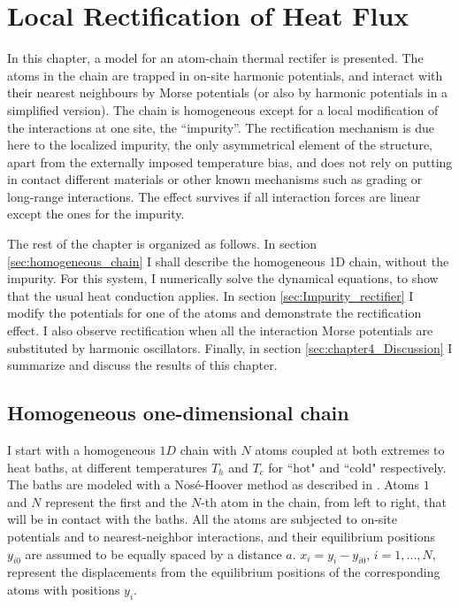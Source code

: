 
\chapter{Local Rectification of Heat Flux}
\label{Chapter4}
%
In this chapter, a model for an atom-chain thermal rectifer is presented. The atoms in the chain are trapped in on-site harmonic potentials, and interact with their nearest neighbours by Morse potentials (or also by harmonic potentials in a simplified version). The chain is homogeneous except for a local modification of the interactions at one site, the ``impurity''. The rectification mechanism is due here to the localized impurity, the only asymmetrical element of the structure, apart from the externally imposed temperature bias, and does not rely on putting in contact different materials or other known mechanisms such as grading or long-range interactions.  The effect survives if all interaction forces are linear except the ones for the impurity.

The rest of the chapter is organized as follows. In section \ref{sec:homogeneous_chain} I shall describe the homogeneous 1D chain, without the impurity.  For this system, I numerically solve the dynamical equations, to show that the usual heat conduction applies. In section \ref{sec:Impurity_rectifier} I modify the potentials for one of the atoms and demonstrate the rectification effect. I also observe rectification when all the interaction Morse potentials are substituted by harmonic oscillators. Finally, in section \ref{sec:chapter4_Discussion} I summarize and discuss the results of this chapter.

\section{Homogeneous one-dimensional chain\label{sec:homogeneous_chain}}

I start with a homogeneous $1D$ chain with $N$ atoms coupled at both extremes to heat baths, at different temperatures $T_h$ and $T_c$ for ``hot" and ``cold" respectively. The baths are modeled with a Nos\' e-Hoover method as described in \cite{Martyna1992}. Atoms $1$ and $N$ represent the first and the $N$-th atom in the chain, from left to right, that will be in contact with the baths. All the atoms are subjected to on-site potentials and to nearest-neighbor interactions, and their equilibrium positions $y_{i0}$ are assumed to be equally spaced by a distance $a$.
$x_i= y_i-y_{i0}$,
$i=1,...,N$, represent the displacements from the equilibrium positions of the corresponding atoms
with positions $y_i$.

